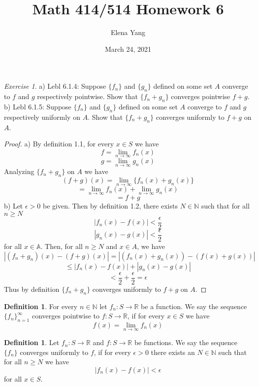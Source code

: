 \documentclass[12pt,oneside]{amsart}
\title{Math 414/514 Homework 6}
\author{Elena Yang}
\date{March 24, 2021}
\theoremstyle{definition}
\newtheorem{definition}[equation]{Definition}
\theoremstyle{remark}
\newtheorem{exer}{Exercise}
\numberwithin{equation}{exer}
\begin{document}
\maketitle
\begin{exer}
a) Lebl 6.1.4: Suppose $\{f_n\}$ and $\{g_n\}$ defined on some set $A$ converge to $f$ and $g$ respectively pointwise. Show that $\{f_n+g_n\}$ converges pointwise $f+g$. \\
b) Lebl 6.1.5: Suppose $\{f_n\}$ and $\{g_n\}$ defined on some set $A$ converge to $f$ and $g$ respectively uniformly on $A$. Show that $\{f_n+g_n\}$ converges uniformly to $f+g$ on $A$.
\end{exer}
\begin{proof}
a) By definition 1.1, for every $x\in S$ we have
$$f=\lim_{n\to\infty}f_n(x)$$
$$g=\lim_{n\to\infty}g_n(x)$$
Analyzing $\{f_n+g_n\}$ on $A$ we have
$$(f+g)(x)=\lim_{n\to\infty}\{f_n(x)+g_n(x)\}$$
$$=\lim_{n\to\infty}f_n(x)+\lim_{n\to\infty}g_n(x)$$
$$=f+g $$
b) Let $\epsilon>0$ be given. Then by definition 1.2, there exists $N\in\mathbb{N}$ such that for all $n\geq N$
$$|f_n(x)-f(x)|<\frac{\epsilon}{2}$$
$$|g_n(x)-g(x)|<\frac{\epsilon}{2}$$
for all $x\in\mathbb{A}$. 
Then, for all $n\geq N$ and $x\in A$, we have
$$|(f_n+g_n)(x)-(f+g)(x)|=|(f_n(x)+g_n(x))-(f(x)+g(x))|$$
$$\leq|f_n(x)-f(x)|+|g_n(x)-g(x)|$$
$$<\frac{\epsilon}{2}+\frac{\epsilon}{2}=\epsilon$$
Thus by definition $\{f_n+g_n\}$ converges uniformly to $f+g$ on $A$.
\end{proof}
\begin{definition}
For every $n\in\mathbb{N}$ let $f_n:S\rightarrow\mathbb{R}$ be a function. We say the sequence $\{f_n\}_{n=1}^\infty$ converges pointwise to $f:S\rightarrow\mathbb{R}$, if for every $x\in S$ we have 
$$f(x)=\lim_{n\to\infty}f_n(x)$$
\end{definition}
\begin{definition}
Let $f_n:S\rightarrow\mathbb{R}$ and $f:S\rightarrow\mathbb{R}$ be functions. We say the sequence $\{f_n\}$ converges uniformly to $f$, if for every $\epsilon>0$ there exists an $N\in\mathbb{N}$ such that for all $n\geq N$ we have 
$$|f_n(x)-f(x)|<\epsilon$$ for all $x\in S$.
\end{definition}

\newpage
\end{document}

